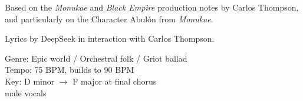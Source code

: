 

\begin{notes}
Based on the \emph{Monukae} and \emph{Black Empire} production notes by Carlos Thompson, and particularly on the Character Abulón from \emph{Monukae}.

Lyrics by DeepSeek in interaction with Carlos Thompson.
\end{notes}

\begin{style}
Genre: Epic world / Orchestral folk / Griot ballad\\
Tempo: 75 BPM, builds to 90 BPM\\
Key: D minor \(\to\) F major at final chorus\\
male vocals
\end{style}

